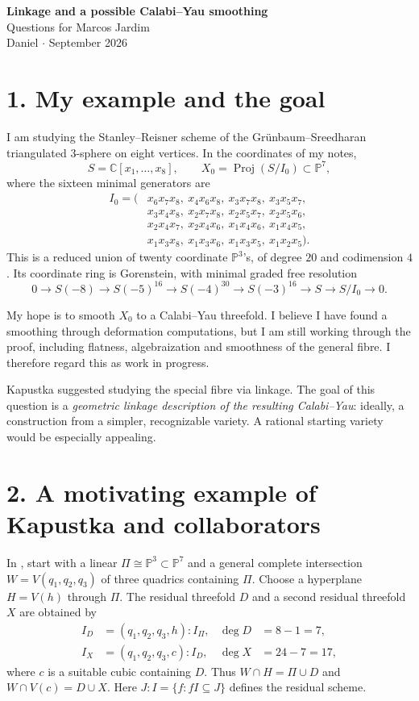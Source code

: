 \documentclass[11pt,a4paper]{article}
\newcommand{\PP}{\mathbb P}
\DeclareMathOperator{\Proj}{Proj}
\begin{document}
\begin{center}
{\Large\bfseries Linkage and a possible Calabi--Yau smoothing}\\[5pt]
{\normalsize Questions for Marcos Jardim}\\[3pt]
{\small Daniel \quad $\cdot$  September 2026}
\end{center}
\vspace{-6pt}

\section*{1. My example and the goal}
I am studying the Stanley--Reisner scheme of the Gr\"unbaum--Sreedharan
triangulated $3$-sphere on eight vertices. In the coordinates of my notes,
\[
S=\mathbb C[x_1,\ldots,x_8],\qquad X_0=\Proj(S/I_0)\subset\PP^7,
\]
where the sixteen minimal generators are
\[
\begin{aligned}
I_0=(&x_6x_7x_8,\ x_4x_6x_8,\ x_3x_7x_8,\ x_3x_5x_7,\\
     &x_3x_4x_8,\ x_2x_7x_8,\ x_2x_5x_7,\ x_2x_5x_6,\\
     &x_2x_4x_7,\ x_2x_4x_6,\ x_1x_4x_6,\ x_1x_4x_5,\\
     &x_1x_3x_8,\ x_1x_3x_6,\ x_1x_3x_5,\ x_1x_2x_5).
\end{aligned}
\]
This is a reduced union of twenty coordinate $\PP^3$'s, of degree $20$
and codimension $4$. Its coordinate ring is Gorenstein, with minimal
graded free resolution
\[
0\longrightarrow S(-8)\longrightarrow S(-5)^{16}
\longrightarrow S(-4)^{30}\longrightarrow S(-3)^{16}
\longrightarrow S\longrightarrow S/I_0\longrightarrow0.
\]

My hope is to smooth $X_0$ to a Calabi--Yau threefold. I believe I have
found a smoothing through deformation computations, but I am still
working through the proof, including flatness, algebraization and
smoothness of the general fibre. I therefore regard this as work in progress.

Kapustka suggested studying the special fibre via linkage. The goal of
this question is a \emph{geometric linkage description of the resulting
Calabi--Yau}: ideally, a construction from a simpler, recognizable variety.
A rational starting variety would be especially appealing.

\section*{2. A motivating example of Kapustka and collaborators}
In \cite[\S4.4]{CGKK}, start with a linear
$\Pi\cong\PP^3\subset\PP^7$ and a general complete intersection
$W=V(q_1,q_2,q_3)$ of three quadrics containing $\Pi$.
Choose a hyperplane $H=V(h)$ through $\Pi$. The residual threefold $D$
and a second residual threefold $X$ are obtained by
\[
\begin{aligned}
I_D&=(q_1,q_2,q_3,h):I_\Pi,
&\deg D&=8-1=7,\\
I_X&=(q_1,q_2,q_3,c):I_D,
&\deg X&=24-7=17,
\end{aligned}
\]
where $c$ is a suitable cubic containing $D$. Thus
$W\cap H=\Pi\cup D$ and $W\cap V(c)=D\cup X$.
Here $J:I=\{f:fI\subseteq J\}$ defines the residual scheme.
\end{document}
